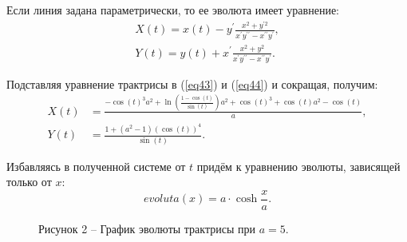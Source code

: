 \documentclass[14pt,a4paper]{extarticle}
\begin{document}
Если линия задана параметрически, то ее эволюта имеет уравнение:
\begin{align}
	X(t)=x(t)-y^{\prime} \frac{x^{2}+y^{\prime 2}}{x^{\prime} y^{\prime \prime}-x^{\prime \prime} y^{\prime}},\label{eq43}\\
	Y(t)=y(t)+x^{\prime} \frac{x^{2}+y^{2}}{x^{\prime} y^{\prime \prime}-x^{\prime \prime} y^{\prime}}.\label{eq44}
\end{align}

Подставляя уравнение трактрисы в (\ref{eq43}) и (\ref{eq44}) и сокращая, получим:
\begin{align}
	X(t)&=\frac{-\cos (t)^{3} a^{2}+\ln \left(\frac{1-\cos (t)}{\sin (t)}\right) a^{2}+\cos (t)^{3}+\cos (t) a^{2}-\cos (t)}{a},\label{eq45}\\
	Y(t)&={\frac {1+ \left( {a}^{2}-1 \right)  \left( \cos \left( t \right) 
			\right) ^{4}}{\sin \left( t \right) }}.\label{eq46}	
\end{align}


Избавляясь в полученной системе от $t$ придём к уравнению эволюты, зависящей только от $x$:
\begin{equation}\label{eq47}
	evoluta(x) = a\cdot \cosh{\frac{x}{a}}.
\end{equation}

\begin{figure}[h]
	\caption*{Рисунок 2 -- График эволюты трактрисы при $a=5$.}
	\label{ris:plot2}
\end{figure}
\end{document}
